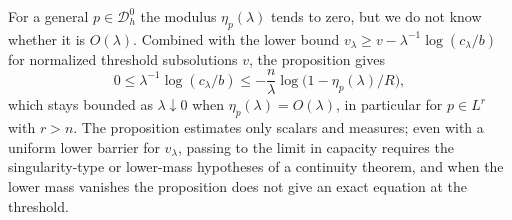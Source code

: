 For a general $p\in\mathcal D_h^0$ the modulus $\eta_p(\lambda)$ tends to zero, but we do not know whether it is $O(\lambda)$. Combined with the lower bound $v_\lambda\geq v-\lambda^{-1}\log(c_\lambda/b)$ for normalized threshold subsolutions $v$, the proposition gives
\[
 0\leq\lambda^{-1}\log(c_\lambda/b)
 \leq-\frac n\lambda\log\bigl(1-\eta_p(\lambda)/R\bigr),
\]
which stays bounded as $\lambda\downarrow0$ when $\eta_p(\lambda)=O(\lambda)$, in particular for $p\in L^r$ with $r>n$. The proposition estimates only scalars and measures; even with a uniform lower barrier for $v_\lambda$, passing to the limit in capacity requires the singularity-type or lower-mass hypotheses of a continuity theorem, and when the lower mass vanishes the proposition does not give an exact equation at the threshold.
